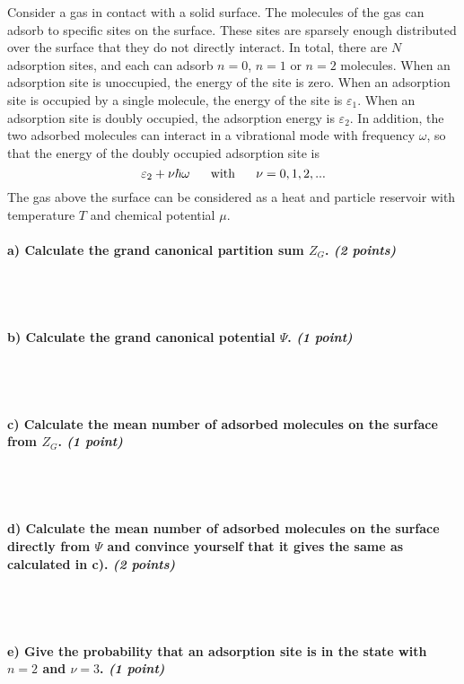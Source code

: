 Consider a gas in contact with a solid surface. The molecules of the gas 
can adsorb to specific sites on the surface. These sites are sparsely 
enough distributed over the surface that they do not directly interact. 
In total, there are $N$ adsorption sites, and each can adsorb $n=0$, 
$n=1$ or $n=2$ molecules.  When an adsorption site is unoccupied, the 
energy of the site is zero. When an adsorption site is occupied by a 
single molecule, the energy of the site is $\varepsilon_1$. When an 
adsorption site is doubly occupied, the adsorption energy is 
$\varepsilon_2$. In addition, the two adsorbed molecules can interact in 
a vibrational mode with frequency $\omega$, so that the energy of the 
doubly occupied adsorption site is
$$\varepsilon_2+\nu\hbar\omega
\ \ \ \ \ \textnormal{with}\ \ \ \ \ 
\nu=0,1,2,...$$
The gas above the surface can be considered as a heat and particle 
reservoir with temperature $T$ and chemical potential $\mu$.

\paragraph{a) Calculate the grand canonical partition sum $Z_G$. 
    \textit{(2 points)}
} \ \\
\\

\paragraph{b) Calculate the grand canonical potential $\Psi$. 
    \textit{(1 point)}
} \ \\
\\

\paragraph{c) Calculate the mean number of adsorbed molecules on the 
    surface from $Z_G$. \textit{(1 point)}
} \ \\
\\

\paragraph{d) Calculate the mean number of adsorbed molecules on the 
    surface directly from $\Psi$ and convince yourself that it gives 
    the same as calculated in c). 
    \textit{(2 points)}
} \ \\
\\

\paragraph{e) Give the probability that an adsorption site is in the 
    state with $n=2$ and $\nu=3$. \textit{(1 point)}
} \ \\
\\
